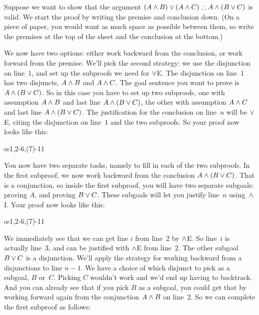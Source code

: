 Suppose we want to show that the argument $(A \eand B) \eor (A \eand C) \therefore A \eand (B \eor C)$ is valid. We start the proof by writing the premise and conclusion down. (On a piece of paper, you would want as much space as possible between them, so write the premises at the top of the sheet and the conclusion at the bottom.)
\begin{fitchproof}
   \PR
\ellipsesline
\end{fitchproof}
We now have two options: either work backward from the conclusion, or work forward from the premise. We'll pick the second strategy: we use the disjunction on line~$1$, and set up the subproofs we need for $\vee$E. The disjunction on line~$1$ has two disjuncts, $A \wedge B$ and $A \wedge C$. The goal sentence you want to prove is $A \wedge (B \vee C)$. So in this case you have to set up two subproofs, one with assumption $A \wedge B$ and last line $A \wedge (B \vee C)$, the other with assumption $A \wedge C$ and last line $A \wedge (B \vee C)$. The justification for the conclusion on line~$n$ will be $\vee$E, citing the disjunction on line~$1$ and the two subproofs. So your proof now looks like this:
\begin{fitchproof}
	\PR
	\open
	\AS
	\ellipsesline 
	\close
	\open
	\AS
	\ellipsesline
	\close
	\oe{1,2-6,(7)-11}
\end{fitchproof}
You now have two separate tasks, namely to fill in each of the two subproofs. In the first subproof, we now work backward from the conclusion $A \wedge (B \vee C)$. That is a conjunction, so inside the first subproof, you will have two separate subgoals: proving $A$, and proving $B \vee C$. These subgoals will let you justify line~$n$ using~$\wedge$I. Your proof now looks like this:
\begin{fitchproof}
	\PR
	\open
	\AS
	\ellipsesline
	\ellipsesline
	\close
	\open
	\AS
	\ellipsesline
	\close
	\oe{1,2-6,(7)-11}
\end{fitchproof}
We immediately see that we can get line $i$ from line~$2$ by $\wedge$E. So line~$i$ is actually line~$3$, and can be justified with $\wedge$E from line~$2$. The other subgoal $B \vee C$ is a disjunction. We'll apply the strategy for working backward from a disjunctions to line $n-1$. We have a choice of which disjunct to pick as a subgoal, $B$ or~$C$. Picking $C$ wouldn't work and we'd end up having to backtrack. And you can already see that if you pick $B$ as a subgoal, you could get that by working forward again from the conjunction $A \wedge B$ on line~$2$. So we can complete the first subproof as follows:

